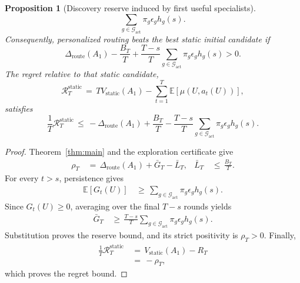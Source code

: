\documentclass{article} %
\newtheorem{proposition}[theorem]{Proposition}
\begin{document}
\begin{proposition}[Discovery reserve induced by first useful specialists]
\begin{equation}
\sum_{g\in\mathcal{G}_{\mathrm{act}}}
\pi_g
\epsilon_g
h_g(s).
\end{equation}
Consequently, personalized routing beats the best static initial candidate if
\begin{equation}
\Delta_{\mathrm{route}}(A_1)
-
\frac{B_T}{T}
+
\frac{T-s}{T}
\sum_{g\in\mathcal{G}_{\mathrm{act}}}
\pi_g
\epsilon_g
h_g(s)
>
0.
\end{equation}
The regret relative to that static candidate,
\begin{equation}
\mathcal{R}_{T}^{\mathrm{static}}
\,=\,
T V_{\mathrm{static}}(A_1)
-
\sum_{t=1}^{T}
\mathbb{E}[\mu(U,a_t(U))],
\end{equation}
satisfies
\begin{equation}
\frac{1}{T}
\mathcal{R}_{T}^{\mathrm{static}}
\,\leq\,
-
\Delta_{\mathrm{route}}(A_1)
+
\frac{B_T}{T}
-
\frac{T-s}{T}
\sum_{g\in\mathcal{G}_{\mathrm{act}}}
\pi_g
\epsilon_g
h_g(s).
\end{equation}
\end{proposition}

\begin{proof}
Theorem~\ref{thm:main} and the exploration certificate give
\begin{equation}
\begin{aligned}
\rho_T
&\,=\,
\Delta_{\mathrm{route}}(A_1)
+
\bar G_T
-
\bar L_T, &
\bar L_T
&\,\leq\,\frac{B_T}{T}.
\end{aligned}
\end{equation}
For every \(t>s\), persistence gives
\begin{equation}
\begin{aligned}
\mathbb{E}[G_t(U)]
&\,\geq\,
\sum_{g\in\mathcal{G}_{\mathrm{act}}}
\pi_g
\epsilon_g
h_g(s).
\end{aligned}
\end{equation}
Since \(G_t(U)\geq0\), averaging over the final \(T-s\) rounds yields
\begin{equation}
\begin{aligned}
\bar G_T
&\,\geq\,
\frac{T-s}{T}
\sum_{g\in\mathcal{G}_{\mathrm{act}}}
\pi_g
\epsilon_g
h_g(s).
\end{aligned}
\end{equation}
Substitution proves the reserve bound, and its strict positivity is
\(\rho_T>0\).  Finally,
\begin{equation}
\begin{aligned}
\frac{1}{T}
\mathcal{R}_{T}^{\mathrm{static}}
&\,=\,
V_{\mathrm{static}}(A_1)
-
R_T
\\
&\,=\,
-\rho_T,
\end{aligned}
\end{equation}
which proves the regret bound.
\end{proof}
\end{document}
